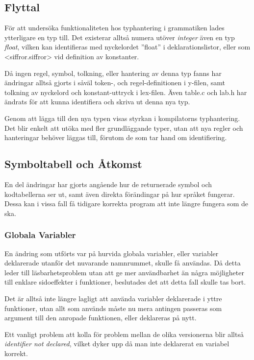 	\subsection{Flyttal}
			För att undersöka funktionaliteten hos typhantering i grammatiken lades ytterligare en typ till. Det existerar alltså numera utöver \textit{integer} även en typ \textit{float}, vilken kan identifieras med nyckelordet ''float'' i deklarationslistor, eller som <siffror.siffror> vid definition av konstanter.

			Då ingen regel, symbol, tolkning, eller hantering av denna typ fanns har ändringar alltså gjorts i såväl token-, och regel-definitionen i y-filen, samt tolkning av nyckelord och konstant-uttryck i lex-filen. Även table.c och lab.h har ändrats för att kunna identifiera och skriva ut denna nya typ.

			Genom att lägga till den nya typen visas styrkan i kompilatorns typhantering. Det blir enkelt att utöka med fler grundläggande typer, utan att nya regler och hanteringar behöver läggas till, förutom de som tar hand om identifiering.

	\subsection{Symboltabell och Åtkomst}
	
		En del ändringar har gjorts angående hur de returnerade symbol och kodtabellerna ser ut, samt även direkta förändingar på hur språket fungerar. Dessa kan i vissa fall få tidigare korrekta program att inte längre fungera som de ska.
	
		\subsubsection{Globala Variabler}
		
			En ändring som utförts var på hurvida globala variabler, eller variabler deklarerade utanför det nuvarande namnrummet, skulle få användas. Då detta leder till läsbarhetsproblem utan att ge mer användbarhet än några möjligheter till enklare sidoeffekter i funktioner, beslutades det att detta fall skulle tas bort.
			
			Det är alltså inte längre lagligt att använda variabler deklarerade i yttre funktioner, utan allt som används måste nu mera antingen passeras som argument till den anropade funktionen, eller deklareras på nytt.
			
			Ett vanligt problem att kolla för problem mellan de olika versionerna blir alltså \textit{identifier not declared}, vilket dyker upp då man inte deklarerat en variabel korrekt.
		
